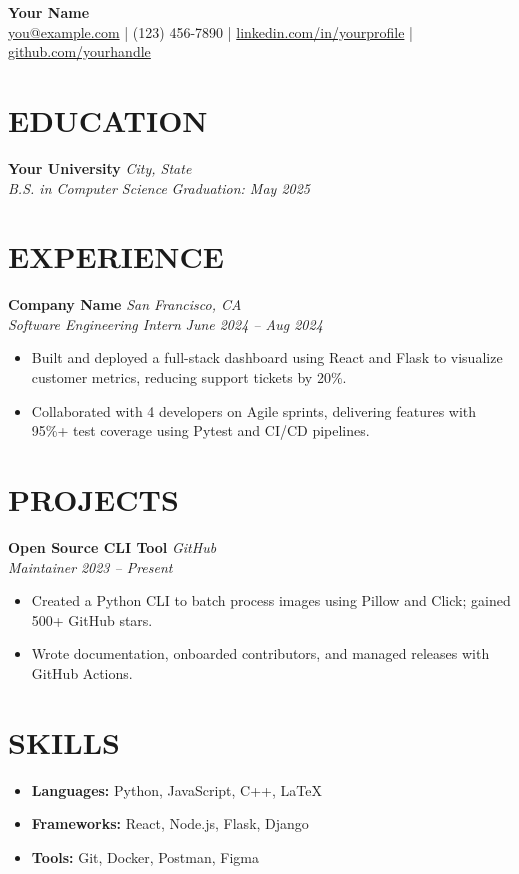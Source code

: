 \documentclass[11pt,a4paper]{article}
\newcommand{\resumeItem}[1]{\item\small{#1}}
\newcommand{\resumeSubheading}[4]{
    \textbf{#1} \hfill \textit{#2} \\
    \textit{#3} \hfill \textit{#4} \\
}
\newcommand{\resumeSection}[1]{
    \section*{\uppercase{#1}}
}
\begin{document}
\begin{center}
    {\LARGE \textbf{Your Name}} \\
    \vspace{2pt}
    \href{mailto:you@example.com}{you@example.com} \quad | \quad (123) 456-7890 \quad | \quad \href{https://linkedin.com/in/yourprofile}{linkedin.com/in/yourprofile} \quad | \quad \href{https://github.com/yourhandle}{github.com/yourhandle}
\end{center}

\resumeSection{Education}
\resumeSubheading
{Your University}{City, State}
{B.S. in Computer Science}{Graduation: May 2025}

\resumeSection{Experience}
\resumeSubheading
{Company Name}{San Francisco, CA}
{Software Engineering Intern}{June 2024 – Aug 2024}
\begin{itemize}
    \resumeItem{Built and deployed a full-stack dashboard using React and Flask to visualize customer metrics, reducing support tickets by 20\%.}
    \resumeItem{Collaborated with 4 developers on Agile sprints, delivering features with 95\%+ test coverage using Pytest and CI/CD pipelines.}
\end{itemize}

\resumeSection{Projects}
\resumeSubheading
{Open Source CLI Tool}{GitHub}
{Maintainer}{2023 – Present}
\begin{itemize}
    \resumeItem{Created a Python CLI to batch process images using Pillow and Click; gained 500+ GitHub stars.}
    \resumeItem{Wrote documentation, onboarded contributors, and managed releases with GitHub Actions.}
\end{itemize}

\resumeSection{Skills}
\begin{itemize}
    \item \textbf{Languages:} Python, JavaScript, C++, LaTeX
    \item \textbf{Frameworks:} React, Node.js, Flask, Django
    \item \textbf{Tools:} Git, Docker, Postman, Figma
\end{itemize}
\end{document}
